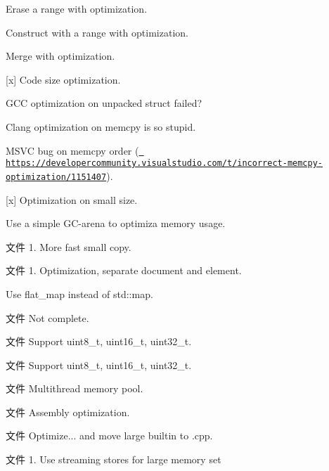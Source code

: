\begin{DoxyRefList}
\begin{DoxyEnumerate}
\item Erase a range with optimization.
\item Construct with a range with optimization.
\item Merge with optimization.
\item \mbox{[}x\mbox{]} Code size optimization.
\item GCC optimization on unpacked struct failed?
\item Clang optimization on memcpy is so stupid.
\item MSVC bug on memcpy order (\href{https://developercommunity.visualstudio.com/t/incorrect-memcpy-optimization/1151407}{\texttt{ https\+://developercommunity.\+visualstudio.\+com/t/incorrect-\/memcpy-\/optimization/1151407}}).
\item \mbox{[}x\mbox{]} Optimization on small size.
\item Use a simple GC-\/arena to optimiza memory usage. 
\end{DoxyEnumerate}
\item[文件 \doxylink{copy_8hpp}{copy.hpp} ]\label{todo__todo000042}%
%
1. More fast small copy. 
\item[文件 \doxylink{document_8hpp}{document.hpp} ]\label{todo__todo000028}%
%
1. Optimization, separate document and element.
\begin{DoxyEnumerate}
\item Use flat\+\_\+map instead of std\+::map. 
\end{DoxyEnumerate}
\item[文件 \doxylink{huffman_8hpp}{huffman.hpp} ]\label{todo__todo000026}%
%
Not complete. 
\item[文件 \doxylink{large-compare-impl_8cpp}{large-\/compare-\/impl.cpp} ]\label{todo__todo000045}%
%
Support uint8\+\_\+t, uint16\+\_\+t, uint32\+\_\+t. 
\item[文件 \doxylink{large-find-impl_8cpp}{large-\/find-\/impl.cpp} ]\label{todo__todo000046}%
%
Support uint8\+\_\+t, uint16\+\_\+t, uint32\+\_\+t. 
\item[文件 \doxylink{memory__pool_8hpp}{memory\+\_\+pool.hpp} ]\label{todo__todo000043}%
%
Multithread memory pool. 
\item[文件 \doxylink{mod__34lsub1_8cpp}{mod\+\_\+34lsub1.cpp} ]\label{todo__todo000049}%
%
Assembly optimization. 
\item[文件 \doxylink{arch_2x86_2biginteger_2detail_2not_8hpp}{not.hpp} ]\label{todo__todo000002}%
%
Optimize... and move large builtin to .cpp. 
\item[文件 \doxylink{set_8cpp}{set.cpp} ]\label{todo__todo000047}%
%
1. Use streaming stores for large memory set ~\newline
 




\end{DoxyRefList}
